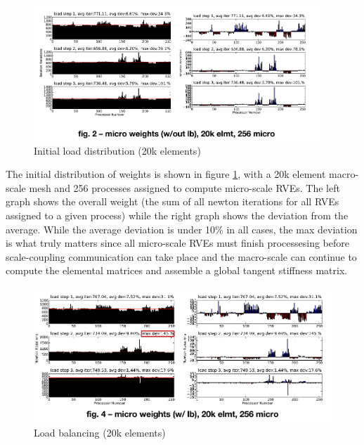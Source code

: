 \begin{figure}
  \begin{center}
    \includegraphics[height=2in]{siam_cse_initial.png}
  \end{center}
  \caption{\small Initial load distribution (20k elements)}
  \label{initial_load}
\end{figure}

The initial distribution of weights is shown in figure \ref{initial_load}, with a 20k element macro-scale mesh and 256 processes assigned to compute micro-scale RVEs. The left graph shows the overall weight (the sum of all newton iterations for all RVEs assigned to a given process) while the right graph shows the deviation from the average. While the average deviation is under 10\% in all cases, the max deviation is what truly matters since all micro-scale RVEs must finish processesing before scale-coupling communication can take place and the macro-scale can continue to compute the elemental matrices and assemble a global tangent stiffness matrix. 

\begin{figure}
  \begin{center}
    \includegraphics[height=2in]{siam_cse_updated.png}
  \end{center}
  \caption{\small Load balancing (20k elements)}
  \label{load_balancing}
\end{figure}


